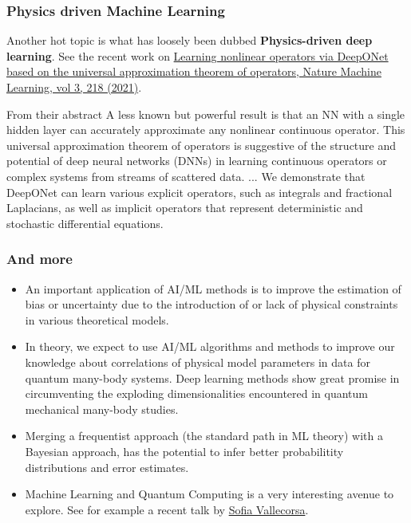 \documentclass{beamer}
\begin{document}
\begin{frame}
\frametitle{Physics driven Machine Learning}

Another hot topic is what has loosely been dubbed \textbf{Physics-driven deep learning}. See the recent work on \href{{https://www.nature.com/articles/s42256-021-00302-5}}{Learning nonlinear operators via DeepONet based on the universal approximation theorem of operators, Nature Machine Learning, vol 3, 218 (2021)}.

\begin{block}{From their abstract }
A less known but powerful result is that an NN with a single hidden layer can accurately approximate any nonlinear continuous operator. This universal approximation theorem of operators is suggestive of the structure and potential of deep neural networks (DNNs) in learning continuous operators or complex systems from streams of scattered data. ...  We demonstrate that DeepONet can learn various explicit operators, such as integrals and fractional Laplacians, as well as implicit operators that represent deterministic and stochastic differential equations. 
\end{block}
\end{frame}

\begin{frame}
\frametitle{And more}

\begin{block}{}
\begin{itemize}
\item An important application of AI/ML methods is to improve the estimation of bias or uncertainty due to the introduction of or lack of physical constraints in various theoretical models.

\item In theory, we expect to use AI/ML algorithms and methods to improve our knowledge about  correlations of physical model parameters in data for quantum many-body systems. Deep learning methods show great promise in circumventing the exploding dimensionalities encountered in quantum mechanical many-body studies. 

\item Merging a frequentist approach (the standard path in ML theory) with a Bayesian approach, has the potential to infer better probabilitity distributions and error estimates. 

\item Machine Learning and Quantum Computing is a very interesting avenue to explore. See for example a recent talk by \href{{https://www.youtube.com/watch?v=7WPKv1Q57os&list=PLUPPQ1TVXK7uHwCTccWMBud-zLyvAf8A2&index=5&ab_channel=ECTstar}}{Sofia Vallecorsa}.
\end{itemize}

\noindent
\end{block}
\end{frame}
\end{document}
